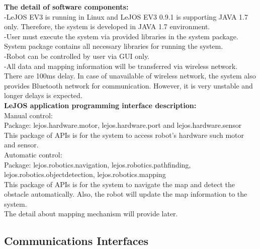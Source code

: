 \documentclass[10pt,a4paper,titlepage]{article}
\begin{document}
\textbf{The detail of software components:}\\

-LeJOS EV3 is running in Linux and LeJOS EV3 0.9.1 is supporting JAVA 1.7 only.     
Therefore, the system is developed in JAVA 1.7 environment.\\

-User must execute the system via provided libraries in the system package. System package contains all necessary libraries for running the system.\\

-Robot can be controlled by user via GUI only.\\

-All data and mapping information will be transferred via wireless network. There are 100ms delay. In case of unavailable of wireless network, the system also provides Bluetooth network for communication. However, it is very unstable and longer delays is expected.\\




\textbf{LeJOS application programming interface description:}\\

Manual control:\\

Package: lejos.hardware.motor, lejos.hardware.port and lejos.hardware.sensor\\

This package of APIs is for the system to access robot’s hardware such motor and sensor.\\

Automatic control:\\

Package: lejos.robotics.navigation, lejos.robotics.pathfinding, lejos.robotics.objectdetection, lejos.robotics.mapping\\

This package of APIs is for the system to navigate the map and detect the obstacle automatically. Also, the robot will update the map information to the system.\\

The detail about mapping mechanism will provide later.\\

\subsection{Communications Interfaces}
\end{document}
